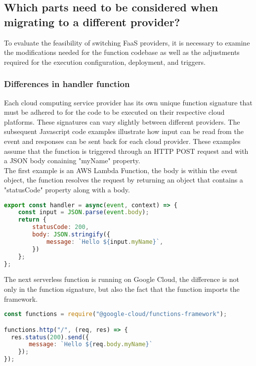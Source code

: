 \subsection{Which parts need to be considered when migrating to a different provider?}
To evaluate the feasibility of switching \Gls{FaaS} providers, it is necessary to examine the modifications needed for the function codebase as well as the adjustments required for the execution configuration, deployment, and triggers.

\subsubsection{Differences in handler function}
Each cloud computing service provider has its own unique function signature that must be adhered to for the code to be executed on their respective cloud platforms. These signatures can vary slightly between different providers. The subsequent Javascript code examples illustrate how input can be read from the event and responses can be sent back for each cloud provider. These examples assume that the function is triggered through an HTTP POST request and with a JSON body conaining "myName" property. \\
The first example is an AWS Lambda Function, the body is within the event object, the function resolves the request by returning an object that contains a "statusCode" property along with a body.

\begin{lstlisting}[frame=lines, caption=Basic AWS Lambda Function, captionpos=b, language=JavaScript, showstringspaces=false]
export const handler = async(event, context) => {
    const input = JSON.parse(event.body);
    return {
        statusCode: 200,
        body: JSON.stringify({
            message: `Hello ${input.myName}`,
        })
    };
};
\end{lstlisting}
The next \gls{serverless} function is running on Google Cloud, the difference is not only in the function signature, but also the fact that the function imports the framework.

\begin{lstlisting}[frame=lines, caption=Basic Gen. 2 Google Cloud Functions, captionpos=b, language=JavaScript, showstringspaces=false]
const functions = require("@google-cloud/functions-framework");

functions.http("/", (req, res) => {
  res.status(200).send({
       message: `Hello ${req.body.myName}`
    });
});
\end{lstlisting}

